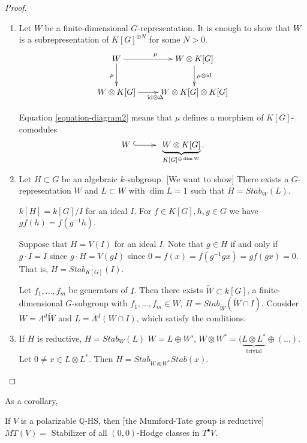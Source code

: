 \begin{proof}
\begin{enumerate}
\item Let $W$ be a finite-dimensional
$G$-representation.
It is enough to show that $W$
is a subrepresentation of $K[G]^{\oplus N}$
for some $N>0$.
\begin{equation}
\label{equation-diagram2}
\xymatrix{
W\ar[r]^{\mu}\ar[d]_{\mu}
&W \otimes K[G]\ar[d]^{\mu \otimes
\text{id}}\\
W \otimes K[G]\ar[r]_{\text{id} \otimes
\Delta}
& W \otimes K[G] \otimes K[G]
}
\end{equation}

\noindent
Equation \ref{equation-diagram2}
means that $\mu$ defines a morphism of
$K[G]$-comodules
$$
W \xymatrix{\ar@{^{(}->}[r]&}\underbrace{W
\otimes K[G]}_{
K[G]^{\oplus \dim W}}.
$$
\item Let $H \subset G$ be an algebraic
$k$-subgroup.
[We want to show] There exists a
$G$-representation $W$
and $L \subset W$ with $\dim L=1$ such that
$H=Stab_W(L)$.

$k[H]=k[G]/I$ for an ideal  $I$.
For $f \in K[G],h,g \in G$ we have
$gf(h)=f(g^{-1}h)$.

Suppose that  $H=V(I)$ for an ideal  $I$.
Note that $g \in H$ if and only if $g\cdot
I=I$
since $g\cdot H=V(g I)$
since $0=f(x)=f(g^{-1}gx)=gf(gx)=0$.
That is, $H=Stab_{K[G]}(I)$.

Let $f_1,…,f_m$
be generators of $I$.
Then there exists $\tilde{W} \subset k[G]$,
a finite-dimensional $G$-subgroup
with $f_1,…,f_m \in W$,
$H=Stab_{\tilde{W}}(\tilde{W} \cap I)$.
Consider $W = \Lambda^d\tilde{W}$
and $L=\Lambda^d(W \cap I)$, which satisfy
the conditions.


\item If $H$ is reductive,  $H=Stab_W(L)$
$W=L \oplus  W'$,
$W \otimes W^* =(\underbrace{L \otimes
L^*}_{\text{trivial}}
\oplus (…)$.
Let $0\neq x \in L \otimes L^*$.
Then $H=Stab_{W \otimes W^*}Stab(x)$.

\end{enumerate}
\end{proof}

\noindent
As a corollary,

\begin{corollary}
\label{lemma-mt-reduc-polar-hs}
If $V$ is a polarizable $\mathbb{Q}$-HS,
then [the Mumford-Tate group is reductive]
$MT(V)=$ Stabilizer of all $(0,0)$-Hodge
classes
in $T^\bullet V$.
\end{corollary}


